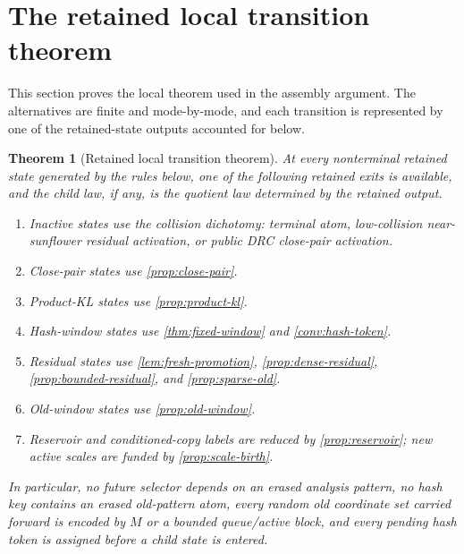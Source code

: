 \documentclass[11pt]{article}
\newcommand{\Cref}[1]{\ref{#1}}
\newtheorem{theorem}{Theorem}[section]
\theoremstyle{remark}
\begin{document}
\section{The retained local transition theorem}\label{sec:local-transition}

This section proves the local theorem used in the assembly argument.  The alternatives are finite and mode-by-mode, and each transition is represented by one of the retained-state outputs accounted for below.

\begin{theorem}[Retained local transition theorem]\label{thm:local-transition}
At every nonterminal retained state generated by the rules below, one of the following retained exits is available, and the child law, if any, is the quotient law determined by the retained output.
\begin{enumerate}[label=\textup{(\roman*)}]
\item Inactive states use the collision dichotomy: terminal atom, low-collision near-sunflower residual activation, or public DRC close-pair activation.
\item Close-pair states use \Cref{prop:close-pair}.
\item Product-KL states use \Cref{prop:product-kl}.
\item Hash-window states use \Cref{thm:fixed-window} and \Cref{conv:hash-token}.
\item Residual states use \Cref{lem:fresh-promotion}, \Cref{prop:dense-residual}, \Cref{prop:bounded-residual}, and \Cref{prop:sparse-old}.
\item Old-window states use \Cref{prop:old-window}.
\item Reservoir and conditioned-copy labels are reduced by \Cref{prop:reservoir}; new active scales are funded by \Cref{prop:scale-birth}.
\end{enumerate}
In particular, no future selector depends on an erased analysis pattern, no hash key contains an erased old-pattern atom, every random old coordinate set carried forward is encoded by $M$ or a bounded queue/active block, and every pending hash token is assigned before a child state is entered.
\end{theorem}
\end{document}
